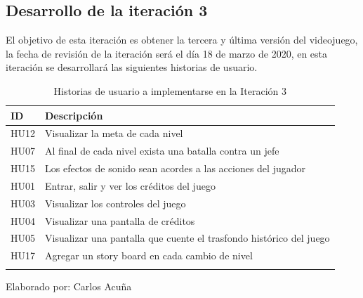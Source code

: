 \documentclass[a4paper, openright, 12pt]{report}
\begin{document}
\subsection*{Desarrollo de la iteración 3}
\justify
El objetivo de esta iteración es obtener la tercera y última versión del videojuego, la fecha de revisión de la iteración será el día 18 de marzo de 2020, en esta iteración se desarrollará las siguientes historias de usuario.

\begin{longtable}{| l | p{5cm} |}
\hline
\captionsetup{justification=centering,margin=2cm}
\centering
\textbf{ID} & \textbf{Descripción} \\ \hline
HU12 &
Visualizar la meta de cada nivel \\ \hline
HU07 &
Al final de cada nivel exista una batalla contra un jefe \\ \hline
HU15 &
Los efectos de sonido sean acordes a las acciones del jugador \\ \hline
HU01 &
Entrar, salir y ver los créditos del juego \\ \hline
HU03 &
Visualizar los controles del juego \\ \hline
HU04 &
Visualizar una pantalla de créditos  \\ \hline
HU05 &
Visualizar una pantalla que cuente el trasfondo histórico del juego\\ \hline 
HU17 &
Agregar un story board en cada cambio de nivel\\ \hline

\caption{Historias de usuario a implementarse en la Iteración 3}
\end{longtable}
\begin{center}
Elaborado por: Carlos Acuña
\end{center}
\end{document}
